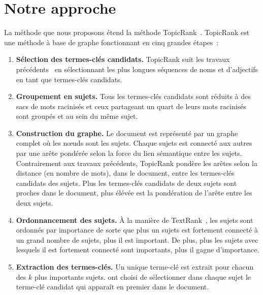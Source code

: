 \section{Notre approche}
\label{sec:main-domain_specific_keyphrase_annotation-topiccorank}
  La méthode que nous proposons étend la méthode
  TopicRank~\cite{bougouin2013topicrank}. TopicRank est une méthode à base de
  graphe fonctionnant en cinq grandes étapes~:
  \begin{enumerate}
    \item{\textbf{Sélection des termes-clés candidats.} TopicRank suit les
          travaux précédents~\cite{wan2008expandrank,hassan2010conundrums} en
          sélectionnant les plus longues séquences de noms et d'adjectifs en
          tant que termes-clés candidats.}
    \item{\textbf{Groupement en sujets.} Tous les termes-clés candidats sont
          réduits à des sacs de mots racinisés et ceux partageant
          un quart de leurs mots racinisés sont groupés et au sein du
          même sujet.}
    \item{\textbf{Construction du graphe.} Le document est représenté par un
          graphe complet où les n\oe{}uds sont les sujets. Chaque sujets est
          connecté aux autres par une arête pondérée selon la force du lien
          sémantique entre les sujets. Contrairement aux travaux précédents,
          TopicRank pondère les arêtes selon la distance (en nombre de mots),
          dans le document, entre les termes-clés candidats des sujets. Plus les
          termes-clés candidats de deux sujets sont proches dans le document,
          plus élévée est la pondération de l'arête entre les deux sujets.}
    \item{\textbf{Ordonnancement des sujets.} À la manière de
          TextRank~\cite{mihalcea2004textrank}, les sujets sont ordonnés par
          importance de sorte que plus un sujets est fortement connecté à un
          grand nombre de sujets, plus il est important. De plus, plus les
          sujets avec lesquels il est fortement connecté sont importants, plus
          il gagne d'importance.}
    \item{\textbf{Extraction des termes-clés.} Un unique terme-clé est extrait
          pour chacun des $k$ plus importants sujets.
           ont choisi de sélectionner dans chaque
          sujet le terme-clé candidat qui apparaît en premier dans le document.}
  \end{enumerate}
  
